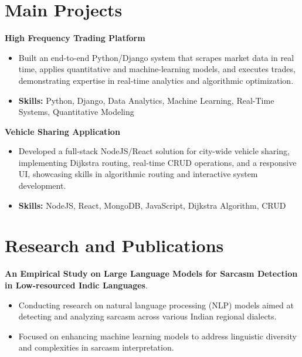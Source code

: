 \documentclass[a4paper,11pt]{article}
\begin{document}
\section{\textbf{Main Projects}}

\vspace{1mm}
  \textbf{High Frequency Trading Platform  }
\vspace{-1.5mm} %
\begin{itemize}
  \item Built an end-to-end Python/Django system that scrapes market data in real time, applies quantitative and machine-learning models, and executes trades, demonstrating expertise in real-time analytics and algorithmic optimization.
\vspace{-3mm}
  \item \textbf{Skills:} Python, Django, Data Analytics, Machine Learning, Real-Time Systems, Quantitative Modeling
\end{itemize}


\vspace{1mm}
   \textbf{Vehicle Sharing Application }
\vspace{-1.5mm} %
\begin{itemize}
  \item Developed a full-stack NodeJS/React solution for city-wide vehicle sharing, implementing Dijkstra routing, real-time CRUD operations, and a responsive UI, showcasing skills in algorithmic routing and interactive system development.
\vspace{-3mm}
  \item \textbf{Skills:} NodeJS, React, MongoDB, JavaScript, Dijkstra Algorithm, CRUD
\end{itemize}



\section{\textbf{Research and Publications} \hfill }
\vspace{1mm}
  \textbf{An Empirical Study on Large Language Models for Sarcasm Detection in Low-resourced Indic Languages}.
\vspace{-1mm} %
\begin{itemize}
  \item Conducting research on natural language processing (NLP) models aimed at detecting and analyzing sarcasm across various Indian regional dialects.
\vspace{-3mm}
  \item Focused on enhancing machine learning models to address linguistic diversity and complexities in sarcasm interpretation.
\end{itemize}
\end{document}
